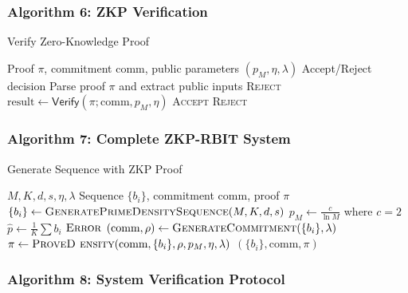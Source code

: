 \documentclass[12pt]{article}
\theoremstyle{plain}
\theoremstyle{definition}
\begin{document}
\subsubsection{Algorithm 6: ZKP Verification}

\begin{algorithm}
\caption{Verify Zero-Knowledge Proof}
\begin{algorithmic}[1]
\REQUIRE Proof $\pi$, commitment $\text{comm}$, public parameters $(p_M, \eta, \lambda)$
\ENSURE Accept/Reject decision
\STATE Parse proof $\pi$ and extract public inputs
    \RETURN \textsc{Reject}
\ENDIF
\STATE $\text{result} \leftarrow \mathsf{Verify}(\pi; \text{comm}, p_M, \eta)$ 
    \RETURN \textsc{Accept}
\ELSE
    \RETURN \textsc{Reject}
\ENDIF
\end{algorithmic}
\end{algorithm}

\subsubsection{Algorithm 7: Complete ZKP-RBIT System}

\begin{algorithm}
\caption{Generate Sequence with ZKP Proof}
\begin{algorithmic}[1]
\REQUIRE $M, K, d, s, \eta, \lambda$
\ENSURE Sequence $\{b_i\}$, commitment $\text{comm}$, proof $\pi$
\STATE $\{b_i\} \leftarrow \textsc{GeneratePrimeDensitySequence}(M, K, d, s)$
\STATE $p_M \leftarrow \frac{c}{\ln M}$ where $c=2$
\STATE $\hat{p} \leftarrow \frac{1}{K}\sum b_i$
    \RETURN $\textsc{Error}$ 
\ENDIF
\STATE $(\text{comm}, \rho) \leftarrow \textsc{GenerateCommitment}(\{b_i\}, \lambda)$
\STATE $\pi \leftarrow \textsc{ProveD ensity}(\text{comm}, \{b_i\}, \rho, p_M, \eta, \lambda)$
\RETURN $(\{b_i\}, \text{comm}, \pi)$
\end{algorithmic}
\end{algorithm}

\subsubsection{Algorithm 8: System Verification Protocol}
\end{document}
